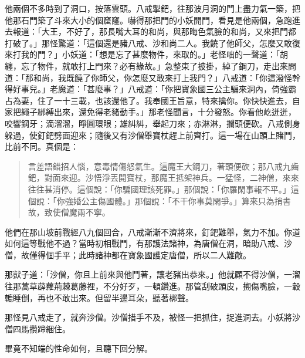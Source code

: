 他兩個不多時到了洞口，按落雲頭。八戒掣鈀，往那波月洞的門上盡力氣一築，把他那石門築了斗來大小的個窟窿。嚇得那把門的小妖開門，看見是他兩個，急跑進去報道：「大王，不好了，那長嘴大耳的和尚，與那晦色氣臉的和尚，又來把門都打破了。」那怪驚道：「這個還是豬八戒、沙和尚二人。我饒了他師父，怎麼又敢復來打我的門？」小妖道：「想是忘了甚麼物件，來取的。」老怪咄的一聲道：「胡纏，忘了物件，就敢打上門來？必有緣故。」急整束了披掛，綽了鋼刀，走出來問道：「那和尚，我既饒了你師父，你怎麼又敢來打上我門？」八戒道：「你這潑怪幹得好事兒。」老魔道：「甚麼事？」八戒道：「你把寶象國三公主騙來洞內，倚強霸占為妻，住了一十三載，也該還他了。我奉國王旨意，特來擒你。你快快進去，自家把繩子綁縛出來，還免得老豬動手。」那老怪聞言，十分發怒。你看他屹迸迸，咬響鋼牙；滴溜溜，睜圓環眼；雄糾糾，舉起刀來；赤淋淋，攔頭便砍。八戒側身躲過，使釘鈀劈面迎來；隨後又有沙僧舉寶杖趕上前齊打。這一場在山頭上賭鬥，比前不同。真個是：
\begin{quote}
言差語錯招人惱，意毒情傷怒氣生。這魔王大鋼刀，著頭便砍；那八戒九齒鈀，對面來迎。沙悟淨丟開寶杖，那魔王抵架神兵。一猛怪，二神僧，來來往往甚消停。這個說：「你騙國理該死罪。」那個說：「你羅閑事報不平。」這個說：「你強婚公主傷國體。」那個說：「不干你事莫閑爭。」算來只為捎書故，致使僧魔兩不寧。
\end{quote}

他們在那山坡前戰經八九個回合，八戒漸漸不濟將來，釘鈀難舉，氣力不加。你道如何這等戰他不過？當時初相戰鬥，有那護法諸神，為唐僧在洞，暗助八戒、沙僧，故僅得個手平；此時諸神都在寶象國護定唐僧，所以二人難敵。

那獃子道：「沙僧，你且上前來與他鬥著，讓老豬出恭來。」他就顧不得沙僧，一溜往那蒿草薜蘿荊棘葛藤裡，不分好歹，一頓鑽進。那管刮破頭皮，搠傷嘴臉，一轂轆睡倒，再也不敢出來。但留半邊耳朵，聽著梆聲。

那怪見八戒走了，就奔沙僧。沙僧措手不及，被怪一把抓住，捉進洞去。小妖將沙僧四馬攢蹄綑住。

畢竟不知端的性命如何，且聽下回分解。

